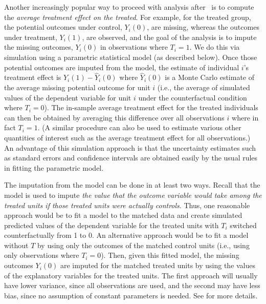 Another increasingly popular way to proceed with analysis after
\MatchIt\ is to compute the \emph{average treatment effect on the
  treated}.  For example, for the treated group, the potential
outcomes under control, $Y_i(0)$, are missing, whereas the outcomes
under treatment, $Y_i(1)$, are observed, and the goal of the analysis
is to impute the missing outcomes, $Y_i(0)$ in observations where
$T_i=1$.  We do this via simulation using a parametric statistical
model (as described below).  Once those potential outcomes are imputed
from the model, the estimate of individual $i$'s treatment effect is
$Y_i(1)-\widehat{Y}_i(0)$ where $\widehat{Y}_i(0)$ is a Monte Carlo
estimate of the average missing potential outcome for unit $i$ (i.e.,
the average of simulated values of the dependent variable for unit $i$
under the counterfactual condition where $T_i=0$).  The in-sample
average treatment effect for the treated individuals can then be
obtained by averaging this difference over all observations $i$ where
in fact $T_i=1$.  (A similar procedure can also be used to estimate
various other quantities of interest such as the average treatment
effect for all observations.)  An advantage of this simulation
approach is that the uncertainty estimates such as standard errors and
confidence intervals are obtained easily by the usual rules in fitting
the parametric model.

The imputation from the model can be done in at least two ways.
Recall that the model is used to impute \emph{the value that the
  outcome variable would take among the treated units if those treated
  units were actually controls}.  Thus, one reasonable approach would
be to fit a model to the matched data and create simulated predicted
values of the dependent variable for the treated units with $T_i$
switched counterfactually from 1 to 0.  An alternative approach would
be to fit a model without $T$ by using only the outcomes of the
matched control units (i.e., using only observations where $T_i=0$).
Then, given this fitted model, the missing outcomes $Y_i(0)$ are
imputed for the matched treated units by using the values of the
explanatory variables for the treated units.  The first approach will
usually have lower variance, since all observations are used, and the
second may have less bias, since no assumption of constant parameters
is needed.  See \citet*{HoImaKin05} for more details.

